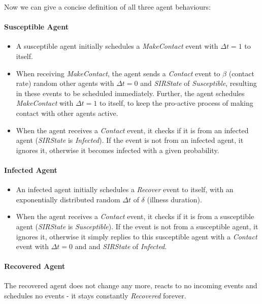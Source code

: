 Now we can give a concise definition of all three agent behaviours:

\paragraph{Susceptible Agent}
\begin{itemize}
	\item A susceptible agent initially schedules a \textit{MakeContact} event with $\Delta t = 1$ to itself.
	\item When receiving \textit{MakeContact}, the agent sends a \textit{Contact} event to $\beta$ (contact rate) random other agents with $\Delta t = 0$ and \textit{SIRState} of \textit{Susceptible}, resulting in these events to be scheduled immediately. Further, the agent schedules \textit{MakeContact} with $\Delta t = 1$ to itself, to keep the pro-active process of making contact with other agents active.
	\item When the agent receives a \textit{Contact} event, it checks if it is from an infected agent (\textit{SIRState} is \textit{Infected}). If the event is not from an infected agent, it ignores it, otherwise it becomes infected with a given probability.
\end{itemize}

\paragraph{Infected Agent}
\begin{itemize}
	\item An infected agent initially schedules a \textit{Recover} event to itself, with an exponentially distributed random $\Delta t$ of $\delta$ (illness duration).
	\item When the agent receives a \textit{Contact} event, it checks if it is from a susceptible agent (\textit{SIRState} is \textit{Susceptible}). If the event is not from a susceptible agent, it ignores it, otherwise it simply replies to this susceptible agent with a \textit{Contact} event with $\Delta t = 0$ and and \textit{SIRState} of \textit{Infected}.
\end{itemize}

\paragraph{Recovered Agent}
The recovered agent does not change any more, reacts to no incoming events and schedules no events - it stays constantly \textit{Recovered} forever.

